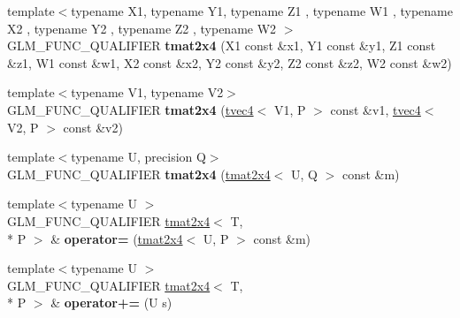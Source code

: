 \begin{DoxyCompactItemize}
\item 
\hypertarget{structglm_1_1detail_1_1tmat2x4_ad19123b26d51d5e015a0667d9dea5ae9}{{\footnotesize template$<$typename X1, typename Y1, typename Z1 , typename W1 , typename X2 , typename Y2 , typename Z2 , typename W2 $>$ }\\G\-L\-M\-\_\-\-F\-U\-N\-C\-\_\-\-Q\-U\-A\-L\-I\-F\-I\-E\-R {\bfseries tmat2x4} (X1 const \&x1, Y1 const \&y1, Z1 const \&z1, W1 const \&w1, X2 const \&x2, Y2 const \&y2, Z2 const \&z2, W2 const \&w2)}\label{structglm_1_1detail_1_1tmat2x4_ad19123b26d51d5e015a0667d9dea5ae9}

\item 
\hypertarget{structglm_1_1detail_1_1tmat2x4_a153edc0a905dc1128b78120c22a27b02}{{\footnotesize template$<$typename V1, typename V2$>$ }\\G\-L\-M\-\_\-\-F\-U\-N\-C\-\_\-\-Q\-U\-A\-L\-I\-F\-I\-E\-R {\bfseries tmat2x4} (\hyperlink{structglm_1_1detail_1_1tvec4}{tvec4}$<$ V1, P $>$ const \&v1, \hyperlink{structglm_1_1detail_1_1tvec4}{tvec4}$<$ V2, P $>$ const \&v2)}\label{structglm_1_1detail_1_1tmat2x4_a153edc0a905dc1128b78120c22a27b02}

\item 
\hypertarget{structglm_1_1detail_1_1tmat2x4_afdac996e0de8c8beee66facceed41f53}{{\footnotesize template$<$typename U, precision Q$>$ }\\G\-L\-M\-\_\-\-F\-U\-N\-C\-\_\-\-Q\-U\-A\-L\-I\-F\-I\-E\-R {\bfseries tmat2x4} (\hyperlink{structglm_1_1detail_1_1tmat2x4}{tmat2x4}$<$ U, Q $>$ const \&m)}\label{structglm_1_1detail_1_1tmat2x4_afdac996e0de8c8beee66facceed41f53}

\item 
\hypertarget{structglm_1_1detail_1_1tmat2x4_a05368bd4ad581b0e7d000b051f71bae5}{{\footnotesize template$<$typename U $>$ }\\G\-L\-M\-\_\-\-F\-U\-N\-C\-\_\-\-Q\-U\-A\-L\-I\-F\-I\-E\-R \hyperlink{structglm_1_1detail_1_1tmat2x4}{tmat2x4}$<$ T, \\*
P $>$ \& {\bfseries operator=} (\hyperlink{structglm_1_1detail_1_1tmat2x4}{tmat2x4}$<$ U, P $>$ const \&m)}\label{structglm_1_1detail_1_1tmat2x4_a05368bd4ad581b0e7d000b051f71bae5}

\item 
\hypertarget{structglm_1_1detail_1_1tmat2x4_a4580596394e88effd02a0ea4f0b1f3a4}{{\footnotesize template$<$typename U $>$ }\\G\-L\-M\-\_\-\-F\-U\-N\-C\-\_\-\-Q\-U\-A\-L\-I\-F\-I\-E\-R \hyperlink{structglm_1_1detail_1_1tmat2x4}{tmat2x4}$<$ T, \\*
P $>$ \& {\bfseries operator+=} (U s)}\label{structglm_1_1detail_1_1tmat2x4_a4580596394e88effd02a0ea4f0b1f3a4}


\end{DoxyCompactItemize}

